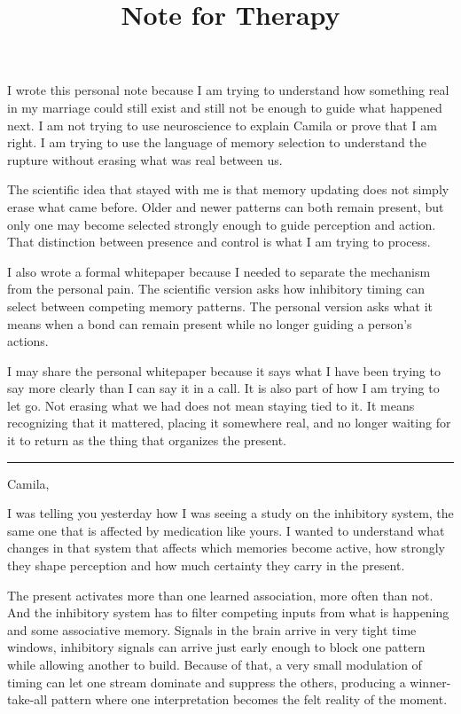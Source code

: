 \documentclass[10pt,twocolumn]{article}
\title{Note for Therapy}
\author{}
\date{}
\begin{document}
\maketitle

I wrote this personal note because I am trying to understand how something real in my marriage could still exist and still not be enough to guide what happened next. I am not trying to use neuroscience to explain Camila or prove that I am right. I am trying to use the language of memory selection to understand the rupture without erasing what was real between us.

The scientific idea that stayed with me is that memory updating does not simply erase what came before. Older and newer patterns can both remain present, but only one may become selected strongly enough to guide perception and action. That distinction between presence and control is what I am trying to process.

I also wrote a formal whitepaper because I needed to separate the mechanism from the personal pain. The scientific version asks how inhibitory timing can select between competing memory patterns. The personal version asks what it means when a bond can remain present while no longer guiding a person's actions.

I may share the personal whitepaper because it says what I have been trying to say more clearly than I can say it in a call. It is also part of how I am trying to let go. Not erasing what we had does not mean staying tied to it. It means recognizing that it mattered, placing it somewhere real, and no longer waiting for it to return as the thing that organizes the present.

\vspace{0.2em}
\hrule
\vspace{0.35em}

Camila,

I was telling you yesterday how I was seeing a study on the inhibitory system, the same one that is affected by medication like yours. I wanted to understand what changes in that system that affects which memories become active, how strongly they shape perception and how much certainty they carry in the present.

The present activates more than one learned association, more often than not. And the inhibitory system has to filter competing inputs from what is happening and some associative memory. Signals in the brain arrive in very tight time windows, inhibitory signals can arrive just early enough to block one pattern while allowing another to build. Because of that, a very small modulation of timing can let one stream dominate and suppress the others, producing a winner-take-all pattern where one interpretation becomes the felt reality of the moment.
\end{document}
